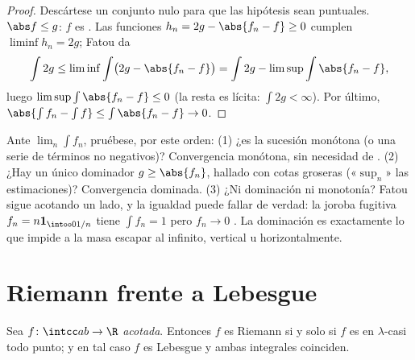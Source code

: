 \begin{proof}
Descártese un conjunto nulo para que las hipótesis sean puntuales.
$\abs f
\leq g$: $f$ es . Las funciones
$h_n = 2g - \abs{f_n
- f} \geq 0$ cumplen $\liminf h_n = 2g$; Fatou da
\[
\int 2g \leq \liminf\int\bigl(2g - \abs{f_n - f}\bigr)
= \int 2g - \limsup\int\abs{f_n - f},
\]
luego $\limsup\int\abs{f_n - f} \leq 0$ (la resta es lícita:
$\int 2g < \infty$). Por último, $\abs{\int f_n - \int f} \leq
\int\abs{f_n - f} \to 0$.
\end{proof}

\begin{method}\label{met:b3:lebesgue:convergence}
Ante $\lim_n\int f_n$, pruébese, por este orden: (1) ¿es la sucesión
monótona (o una serie de términos no negativos)? Convergencia monótona,
sin necesidad de . (2) ¿Hay
un único dominador 
$g \geq \abs{f_n}$, hallado con cotas groseras («$\sup_n$» las
estimaciones)? Convergencia dominada. (3) ¿Ni dominación ni monotonía?
Fatou sigue acotando un lado, y la igualdad puede fallar de verdad: la
joroba fugitiva $f_n = n\mathbf
1_{\intoo0{1/n}}$ tiene $\int f_n = 1$ pero $f_n \to 0$ . La dominación es exactamente lo que impide a la masa escapar al
infinito, vertical u horizontalmente.
\end{method}

\section{Riemann frente a Lebesgue}

\begin{theorem}
\label{thm:b3:lebesgue:riemann}
Sea $f \colon \intcc ab \to \R$ \emph{acotada}. Entonces $f$ es
 Riemann si y solo si $f$ es
 en $\lambda$-casi todo
punto; y en tal caso $f$ es 
Lebesgue y ambas integrales coinciden.
\end{theorem}


